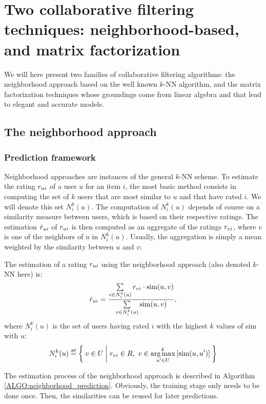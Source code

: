 \section{Two collaborative filtering techniques: neighborhood-based, and matrix
factorization}
\label{SEC:neighborhood_and_matrix_facto_review}

We will here present two families of collaborative filtering algorithms: the
neighborhood approach based on the well known $k$-NN algorithm, and the matrix
factorization techniques whose groundings come from linear algebra and that
lead to elegant and accurate models.

\subsection{The neighborhood approach}

\subsubsection{Prediction framework}

Neighborhood approaches are instances of the general $k$-NN scheme. To estimate
the rating $r_{ui}$ of a user $u$ for an item $i$, the most basic method consists
in computing  the set of $k$ users that are most similar to $u$ and
that have rated $i$. We will denote this set $N_i^k(u)$. The computation of
$N_i^k(u)$ depends of course on a similarity measure between users, which is
based on their respective ratings. The estimation $\hat{r}_{ui}$ of $r_{ui}$ is then
computed as an aggregate of the ratings $r_{vi}$, where $v$ is one of the
neighbors of $u$ in $N_i^k(u)$. Usually, the aggregation is simply a mean
weighted by the similarity between $u$ and $v$:

\begin{definition}
  The estimation of a rating $r_{ui}$ using the neighborhood approach (also
  denoted $k$-NN here) is:
  $$\hat{r}_{ui} = \frac{\sum\limits_{v \in N_i^k(u)} r_{vi} \cdot \text{sim}(u, v)}
  {\sum\limits_{v \in N_i^k(u)}\text{sim}(u, v)},$$
  where $N_i^k(u)$ is the set of users having rated $i$ with the highest $k$
  values of sim with $u$:
  $$N_i^k(u) \eqdef \Set{v \in U | \rvi \in R,~v\in \argmax_{u' \in
  U}^k\left[\ssim(u, u')\right]}$$
\end{definition}

The estimation process of the neighborhood approach is described in Algorithm
\ref{ALGO:neighborhood_prediction}.  Obviously, the training stage only needs
to be done once. Then, the
similarities can be reused for later predictions.

